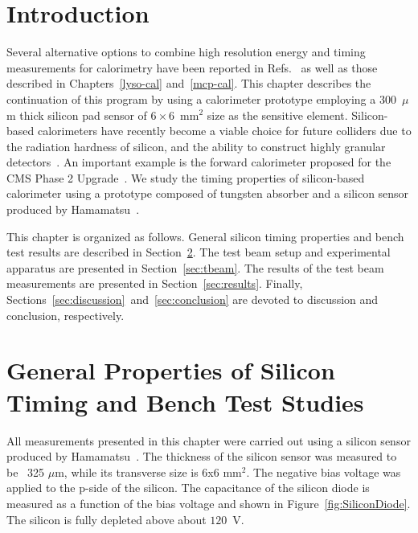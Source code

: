 \section{Introduction}
Several alternative options to combine high resolution energy and timing
measurements for calorimetry have been reported in Refs.~\cite{Ronzhin2015288, Ronzhin201552, Brianza2015216, sixie,
spiropulu} as well as those described in Chapters~\ref{lyso-cal} and~\ref{mcp-cal}.
This chapter describes the continuation of this program by using a
calorimeter prototype employing a 300~$\mu$m thick silicon pad sensor of
$6\times 6$~mm$^2$ size as the sensitive element. Silicon-based calorimeters have
recently become a viable choice for future colliders due to the radiation
hardness of silicon, and the ability to construct highly granular
detectors~\cite{Adloff:2011ha}. An important example is the forward calorimeter
proposed for the CMS Phase 2 Upgrade~\cite{Butler:2020886}. We study the timing
properties of silicon-based calorimeter using a prototype composed of tungsten
absorber and a silicon sensor produced by Hamamatsu~\cite{hamamatsu}. %

This chapter is organized as follows. General silicon timing properties and bench
test results are described in Section~\ref{sec:siliconpad}. The test beam setup
and experimental apparatus are presented in Section~\ref{sec:tbeam}. The results
of the test beam measurements are presented in Section~\ref{sec:results}.
Finally, Sections~\ref{sec:discussion}~and~\ref{sec:conclusion} are devoted to discussion
and conclusion, respectively.

\section{General Properties of Silicon Timing and Bench Test Studies}
\label{sec:siliconpad}
All measurements presented in this chapter were carried out using a silicon sensor produced by
Hamamatsu~\cite{hamamatsu}. The thickness of the silicon sensor was measured to be ~325
$\mu$m, while its transverse size is 6x6 mm$^2$. The negative bias
voltage was applied to the p-side of the silicon. The capacitance
of the silicon diode is measured as a function of the bias voltage
and shown in Figure~\ref{fig:SiliconDiode}. The silicon
is fully depleted above about $120$~V. 


